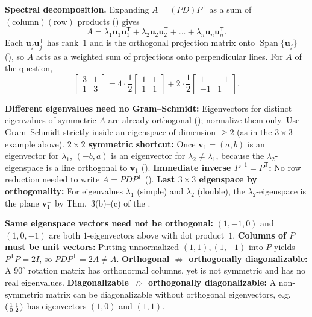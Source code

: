 \documentclass[10pt]{scrartcl}
\newcommand{\vv}[1]{\mathbf{#1}}
\DeclareMathOperator{\spn}{Span}
\begin{document}
\noindent\textbf{Spectral decomposition.} Expanding $A=(PD)P^{\mathsf T}$ as a sum of $(\text{column})(\text{row})$ products () gives
\[
  A = \lambda_1\vv u_1\vv u_1^{\mathsf T} + \lambda_2\vv u_2\vv u_2^{\mathsf T} + \dots + \lambda_n\vv u_n\vv u_n^{\mathsf T}.
\]
Each $\vv u_j\vv u_j^{\mathsf T}$ has rank~$1$ and is the orthogonal projection matrix onto $\spn\{\vv u_j\}$ (), so $A$ acts as a weighted sum of projections onto perpendicular lines. For $A$ of the question,
\[
  \begin{bmatrix}3&1\\1&3\end{bmatrix} = 4\cdot\frac12\begin{bmatrix}1&1\\1&1\end{bmatrix} + 2\cdot\frac12\begin{bmatrix}1&-1\\-1&1\end{bmatrix}.
\]

\begin{shortcuts}
  \ii \textbf{Different eigenvalues need no Gram--Schmidt:} Eigenvectors for distinct eigenvalues of symmetric $A$ are already orthogonal (); normalize them only. Use Gram--Schmidt strictly inside an eigenspace of dimension $\ge 2$ (as in the $3\times 3$ example above).
  \ii \textbf{$2\times 2$ symmetric shortcut:} Once $\vv v_1=(a,b)$ is an eigenvector for $\lambda_1$, $(-b,a)$ is an eigenvector for $\lambda_2\ne\lambda_1$, because the $\lambda_2$-eigenspace is a line orthogonal to $\vv v_1$ ().
  \ii \textbf{Immediate inverse $P^{-1}=P^{\mathsf T}$:} No row reduction needed to write $A=PDP^{\mathsf T}$ ().
  \ii \textbf{Last $3\times 3$ eigenspace by orthogonality:} For eigenvalues $\lambda_1$ (simple) and $\lambda_2$ (double), the $\lambda_2$-eigenspace is the plane $\vv v_1^\perp$ by Thm.~3(b)--(c) of the .
\end{shortcuts}

\begin{trapbox}
  \ii \textbf{Same eigenspace vectors need not be orthogonal:} $(1,-1,0)$ and $(1,0,-1)$ are both $1$-eigenvectors above with dot product~$1$.
  \ii \textbf{Columns of $P$ must be unit vectors:} Putting unnormalized $(1,1),(1,-1)$ into $P$ yields $P^{\mathsf T}P=2I$, so $PDP^{\mathsf T}=2A\neq A$.
  \ii \textbf{Orthogonal $\not\Rightarrow$ orthogonally diagonalizable:} A $90^\circ$ rotation matrix has orthonormal columns, yet is not symmetric and has no real eigenvalues.
  \ii \textbf{Diagonalizable $\not\Rightarrow$ orthogonally diagonalizable:} A non-symmetric matrix can be diagonalizable without orthogonal eigenvectors, e.g.\ $\begin{psmallmatrix}1&1\\0&2\end{psmallmatrix}$ has eigenvectors $(1,0)$ and $(1,1)$.
\end{trapbox}
\end{document}
